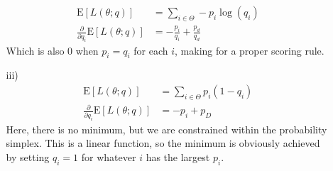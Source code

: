 \documentclass[11pt]{article}
\newcommand{\E}{\mathrm{E}}
\theoremstyle{definition}
\begin{document}
\begin{itemize}
\begin{itemize}
                \begin{align*}
                    \E[L(\theta;q)] &= \sum_{i\in\Theta}-p_i\log(q_i)  \\
                    \frac{\partial}{\partial q_i}\E[L(\theta;q)] &= -\frac{p_i}{q_i} + \frac{p_d}{q_d}
                \end{align*}
                Which is also $0$ when $p_i=q_i$ for each $i$, making for a proper scoring rule.
            \item[iii)]
                \begin{align*}
                    \E[L(\theta;q)] &= \sum_{i\in\Theta} p_i(1-q_i) \\
                    \frac{\partial}{\partial q_i}\E[L(\theta;q)] &= -p_i + p_D 
                \end{align*}
                Here, there is no minimum, but we are constrained within the probability simplex. This is a linear function, so the minimum is obviously achieved by setting $q_i=1$ for whatever $i$ has the largest $p_i$. 


\end{itemize}
\end{itemize}
\end{document}
